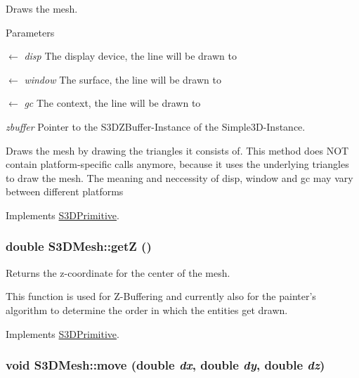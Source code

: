 Draws the mesh. 


\begin{DoxyParams}{Parameters}
\item[\mbox{$\leftarrow$} {\em disp}]The display device, the line will be drawn to \item[\mbox{$\leftarrow$} {\em window}]The surface, the line will be drawn to \item[\mbox{$\leftarrow$} {\em gc}]The context, the line will be drawn to \item[{\em zbuffer}]Pointer to the S3DZBuffer-\/Instance of the Simple3D-\/Instance.\end{DoxyParams}
Draws the mesh by drawing the triangles it consists of. This method does NOT contain platform-\/specific calls anymore, because it uses the underlying triangles to draw the mesh. The meaning and neccessity of disp, window and gc may vary between different platforms 

Implements \hyperlink{class_s3_d_primitive_a857f042bc63ae6233b63b60089e92b81}{S3DPrimitive}.

\hypertarget{class_s3_d_mesh_aa11c4dd0ce01443c07afaabc0e206881}{
\subsubsection[{getZ}]{\setlength{\rightskip}{0pt plus 5cm}double S3DMesh::getZ ()}}
\label{class_s3_d_mesh_aa11c4dd0ce01443c07afaabc0e206881}


Returns the z-\/coordinate for the center of the mesh. 

This function is used for Z-\/Buffering and currently also for the painter's algorithm to determine the order in which the entities get drawn. 

Implements \hyperlink{class_s3_d_primitive_ab5b06d3a8e83216cc42554bb78afd2d9}{S3DPrimitive}.

\hypertarget{class_s3_d_mesh_a15edf10bf8a749627f11235c618734f7}{
\subsubsection[{move}]{\setlength{\rightskip}{0pt plus 5cm}void S3DMesh::move (double {\em dx}, \/  double {\em dy}, \/  double {\em dz})}}
\label{class_s3_d_mesh_a15edf10bf8a749627f11235c618734f7}


